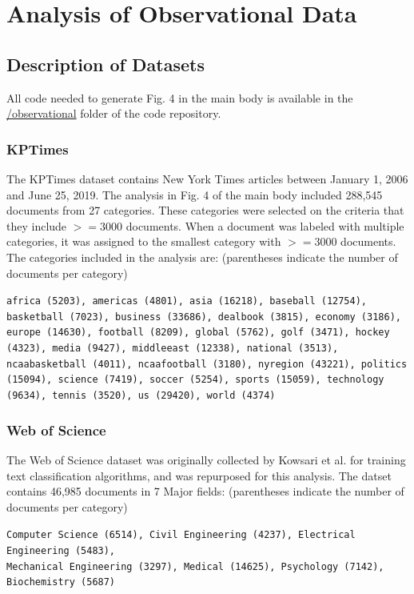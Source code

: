 \documentclass{article}
\begin{document}
\section{Analysis of Observational Data}

\subsection{Description of Datasets}
All code needed to generate Fig. 4 in the main body is available in the \href{https://github.com/JamesPHoughton/interdependent-diffusion/tree/master/observational}{/observational} folder of the code repository.

\subsubsection{KPTimes}
The KPTimes dataset \cite{gallina-etal-2019-kptimes} contains New York Times articles between January 1, 2006 and June 25, 2019. The analysis in Fig. 4 of the main body included 288,545 documents from 27 categories. These categories were selected on the criteria that they include $>= 3000$ documents. When a document was labeled with multiple categories, it was assigned to the smallest category with $>= 3000$ documents. The categories included in the analysis are: (parentheses indicate the number of documents per category) 

\noindent
\texttt{africa (5203), americas (4801), asia (16218), baseball (12754), basketball (7023), business (33686), dealbook (3815), economy (3186), europe (14630), football (8209), global (5762), golf (3471), hockey (4323), media (9427), middleeast (12338), national (3513), ncaabasketball (4011), ncaafootball (3180), nyregion (43221), politics (15094), science (7419), soccer (5254), sports (15059), technology (9634), tennis (3520), us (29420), world (4374)}

\subsubsection{Web of Science}
The Web of Science dataset \cite{WOSv6} was originally collected by Kowsari et al. \cite{kowsari2017HDLTex} for training text classification algorithms, and was repurposed for this analysis. The datset contains 46,985 documents in 7 Major fields: (parentheses indicate the number of documents per category)

\noindent
\texttt{Computer Science (6514), Civil Engineering (4237), Electrical Engineering (5483), \\Mechanical Engineering (3297), Medical (14625), Psychology (7142), Biochemistry (5687)}
\end{document}
